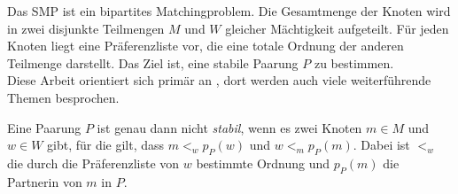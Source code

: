 Das SMP ist ein bipartites Matchingproblem. Die Gesamtmenge der Knoten wird in zwei disjunkte Teilmengen $M$ und $W$ gleicher Mächtigkeit aufgeteilt. Für jeden Knoten liegt eine Präferenzliste vor, die eine totale Ordnung der anderen Teilmenge darstellt. Das Ziel ist, eine stabile Paarung $P$ zu bestimmen.\\

Diese Arbeit orientiert sich primär an \cite{Gusfield:1989}, dort werden auch viele wei\-ter\-füh\-ren\-de Themen besprochen.

\begin{Definition}
\label{stabil}
  Eine Paarung $P$ ist genau dann nicht \textit{stabil}, wenn es zwei Knoten $m \in M$ und $w \in W$ gibt, für die gilt, dass $m <_{w} p_{P}(w)$ und $w <_{m} p_{P}(m)$. Dabei ist $<_{w}$ die durch die Präferenzliste von $w$ bestimmte Ordnung und $p_{P}(m)$ die Partnerin von $m$ in $P$.
\end{Definition}
